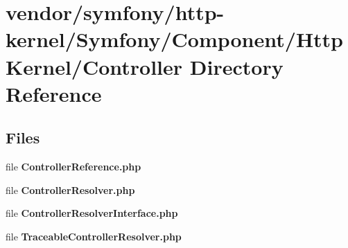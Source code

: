 \section{vendor/symfony/http-\/kernel/\+Symfony/\+Component/\+Http\+Kernel/\+Controller Directory Reference}
\label{dir_2f939b64e5b49a39566c20a4e8e7df9c}
\subsection*{Files}
\begin{DoxyCompactItemize}
\item 
file {\bf Controller\+Reference.\+php}
\item 
file {\bf Controller\+Resolver.\+php}
\item 
file {\bf Controller\+Resolver\+Interface.\+php}
\item 
file {\bf Traceable\+Controller\+Resolver.\+php}
\end{DoxyCompactItemize}
